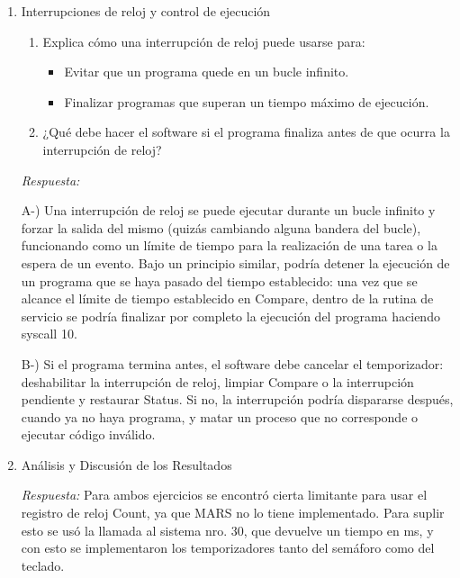 \documentclass[11pt, a4paper]{article}
\begin{document}
\begin{enumerate}[leftmargin=*, label=\arabic*.]
    \item Interrupciones de reloj y control de ejecución
    \begin{enumerate}[label=\alph*)]
        \item Explica cómo una interrupción de reloj puede usarse para:
        \begin{itemize}
            \item Evitar que un programa quede en un bucle infinito.
            \item Finalizar programas que superan un tiempo máximo de ejecución.
        \end{itemize}
        \item ¿Qué debe hacer el software si el programa finaliza antes de que ocurra la interrupción de reloj?
    \end{enumerate}

    \vspace{0.2cm}
    \textit{Respuesta:}

    A-) Una interrupción de reloj se puede ejecutar durante un bucle infinito y forzar la salida del mismo (quizás cambiando alguna bandera del bucle), funcionando como un límite de tiempo para la realización de una tarea o la espera de un evento. Bajo un principio similar, podría detener la ejecución de un programa que se haya pasado del tiempo establecido: una vez que se alcance el límite de tiempo establecido en Compare, dentro de la rutina de servicio se podría finalizar por completo la ejecución del programa haciendo syscall 10.

    B-) Si el programa termina antes, el software debe cancelar el temporizador: deshabilitar la interrupción de reloj, limpiar Compare o la interrupción pendiente y restaurar Status. Si no, la interrupción podría dispararse después, cuando ya no haya programa, y matar un proceso que no corresponde o ejecutar código inválido.
    \vspace{2cm}

    \item Análisis y Discusión de los Resultados

    \vspace{0.2cm}
    \textit{Respuesta:} Para ambos ejercicios se encontró cierta limitante para usar el registro de reloj Count, ya que MARS no lo tiene implementado. Para suplir esto se usó la llamada al sistema nro. 30, que devuelve un tiempo en ms, y con esto se implementaron los temporizadores tanto del semáforo como del teclado.
    \vspace{2cm}

\end{enumerate}
\end{document}
